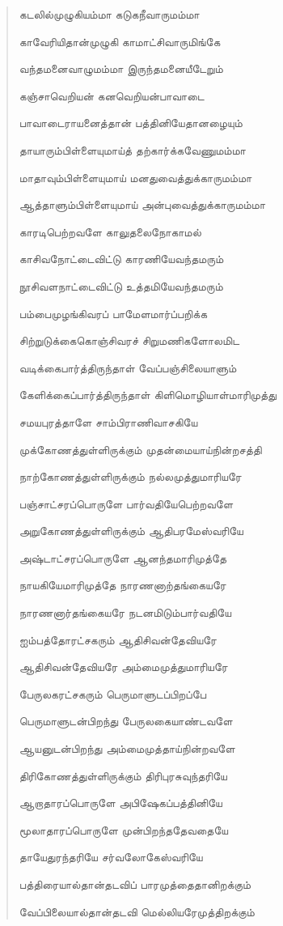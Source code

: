 \documentclass{article}
\begin{document}
\begin{quotation}
{கடலில்முழுகியம்மா கடுகநீவாருமம்மா

காவேரியிதான்முழுகி காமாட்சிவாருமிங்கே

வந்தமனைவாழுமம்மா இருந்தமனையீடேறும்

கஞ்சாவெறியன் கனவெறியன்பாவாடை

பாவாடைராயனைத்தான் பத்தினியேதானழையும்

தாயாரும்பிள்ளையுமாய்த் தற்கார்க்கவேணுமம்மா

மாதாவும்பிள்ளையுமாய் மனதுவைத்துக்காருமம்மா

ஆத்தாளும்பிள்ளையுமாய் அன்புவைத்துக்காருமம்மா

காரடிபெற்றவளே காலுதலைநோகாமல்

காசிவநோட்டைவிட்டு காரணியேவந்தமரும்

நூசிவளநாட்டைவிட்டு உத்தமியேவந்தமரும்

பம்பைமுழங்கிவரப் பாமேளமார்ப்பறிக்க

சிற்றுடுக்கைகொஞ்சிவரச் சிறுமணிகளோலமிட

வடிக்கைபார்த்திருந்தாள் வேப்பஞ்சிலையாளும்

கேளிக்கைப்பார்த்திருந்தாள் கிளிமொழியாள்மாரிமுத்து

சமயபுரத்தாளே சாம்பிராணிவாசகியே

முக்கோணத்துள்ளிருக்கும் முதன்மையாய்நின்றசத்தி

நாற்கோணத்துள்ளிருக்கும் நல்லமுத்துமாரியரே

பஞ்சாட்சரப்பொருளே பார்வதியேபெற்றவளே

அறுகோணத்துள்ளிருக்கும் ஆதிபரமேஸ்வரியே

அஷ்டாட்சரப்பொருளே ஆனந்தமாரிமுத்தே

நாயகியேமாரிமுத்தே நாரணனாற்தங்கையரே

நாரணனார்தங்கையரே நடனமிடும்பார்வதியே

ஐம்பத்தோரட்சகரும் ஆதிசிவன்தேவியரே

ஆதிசிவன்தேவியரே அம்மைமுத்துமாரியரே

பேருலகரட்சகரும் பெருமாளுடப்பிறப்பே

பெருமாளுடன்பிறந்து பேருலகையாண்டவளே

ஆயனுடன்பிறந்து அம்மைமுத்தாய்நின்றவளே

திரிகோணத்துள்ளிருக்கும் திரிபுரசுவுந்தரியே

ஆறாதாரப்பொருளே அபிஷேகப்பத்தினியே

மூலாதாரப்பொருளே முன்பிறந்ததேவதையே

தாயேதுரந்தரியே சர்வலோகேஸ்வரியே

பத்திரையால்தான்தடவிப் பாரமுத்தைதானிறக்கும்

வேப்பிலையால்தான்தடவி மெல்லியரேமுத்திறக்கும்

}
\end{quotation}
\end{document}
